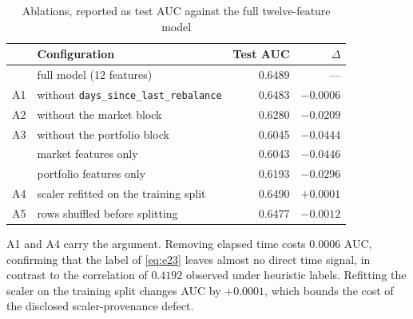 \begin{table}[t]
\caption{Ablations, reported as test AUC against the full twelve-feature model}
\label{tab:t9}
\centering
\scriptsize
\setlength{\tabcolsep}{3pt}
\begin{tabular}{@{}llrr@{}}
\toprule
& Configuration & Test AUC & $\Delta$ \\
\midrule
& full model (12 features) & 0.6489 & --- \\
A1 & without \texttt{days\_since\_last\_rebalance} & 0.6483 & $-0.0006$ \\
A2 & without the market block & 0.6280 & $-0.0209$ \\
A3 & without the portfolio block & 0.6045 & $-0.0444$ \\
& market features only & 0.6043 & $-0.0446$ \\
& portfolio features only & 0.6193 & $-0.0296$ \\
A4 & scaler refitted on the training split & 0.6490 & $+0.0001$ \\
A5 & rows shuffled before splitting & 0.6477 & $-0.0012$ \\
\bottomrule
\end{tabular}

\vspace{0.5mm}
\raggedright\footnotesize
A1 and A4 carry the argument. Removing elapsed time costs $0.0006$ AUC, confirming
that the label of \eqref{eq:e23} leaves almost no direct time signal, in contrast
to the correlation of $0.4192$ observed under heuristic labels. Refitting the
scaler on the training split changes AUC by $+0.0001$, which bounds the cost of the
disclosed scaler-provenance defect.
\end{table}
